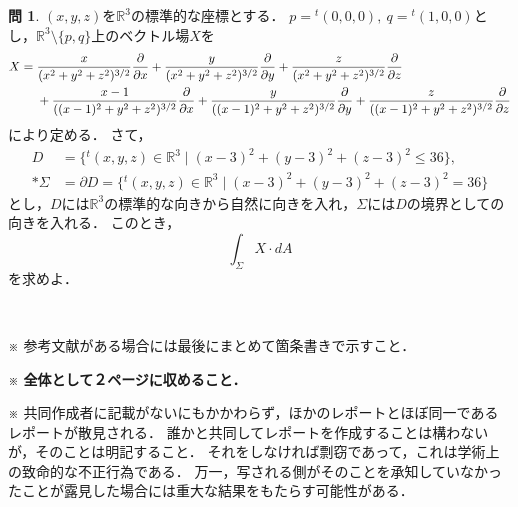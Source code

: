 \documentclass[dvipdfmx,uplatex,nosetpagesize]{jsarticle}
\newcommand\R{\mathbb{R}}
\theoremstyle{definition}
\newtheorem*{question*}{問}
\theoremstyle{StatementsWithStar}
\theoremstyle{StatementsWithStar2}
\theoremstyle{StatementsWithStar3}
\theoremstyle{StatementsWithCCirc}
\theoremstyle{definition}
\begin{document}
\noindent
\begin{question*}
$(x,y,z)$を$\R^3$の標準的な座標とする．
$p={}^t(0,0,0),\ q={}^t(1,0,0)$とし，$\R^3\setminus\{p,q\}$上のベクトル場$X$を
\begin{align*}
X&=\frac{x}{(x^2+y^2+z^2)^{3/2}}\frac{\partial}{\partial x}+\frac{y}{(x^2+y^2+z^2)^{3/2}}\frac{\partial}{\partial y}+\frac{z}{(x^2+y^2+z^2)^{3/2}}\frac{\partial}{\partial z}\\*
&\hphantom{{}={}}+\frac{x-1}{((x-1)^2+y^2+z^2)^{3/2}}\frac{\partial}{\partial x}+\frac{y}{((x-1)^2+y^2+z^2)^{3/2}}\frac{\partial}{\partial y}+\frac{z}{((x-1)^2+y^2+z^2)^{3/2}}\frac{\partial}{\partial z}
\end{align*}
により定める．
さて，
\begin{align*}
D&=\{{}^t(x,y,z)\in\R^3\mid(x-3)^2+(y-3)^2+(z-3)^2\leq36\},\\*
\Sigma&=\partial D=\{{}^t(x,y,z)\in\R^3\mid(x-3)^2+(y-3)^2+(z-3)^2=36\}
\end{align*}とし，$D$には$\R^3$の標準的な向きから自然に向きを入れ，$\Sigma$には$D$の境界としての向きを入れる．
このとき，
\[
\int_{\Sigma}X\cdot dA
\]
を求めよ．
\end{question*}
\par
\ \par
\noindent
{\small
※ 参考文献がある場合には最後にまとめて箇条書きで示すこと．\par\noindent
※ \textbf{全体として２ページに収めること．}\par\noindent
※ 共同作成者に記載がないにもかかわらず，ほかのレポートとほぼ同一であるレポートが散見される．
誰かと共同してレポートを作成することは構わないが，そのことは明記すること．
それをしなければ剽窃であって，これは学術上の致命的な不正行為である．
万一，写される側がそのことを承知していなかったことが露見した場合には重大な結果をもたらす可能性がある．
}
\end{document}
